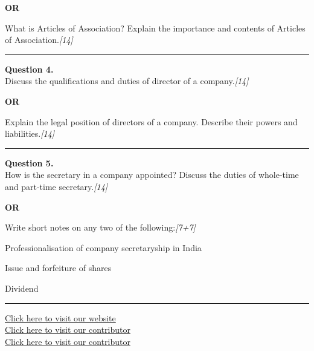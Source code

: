 \documentclass[11pt,a4paper]{article}
\newcommand{\pts}[1]{\hfill   \textit{[#1]}}
\begin{document}
\centerline{   \textbf{OR}}

What is Articles of Association? Explain the importance and contents of Articles of Association.\pts{14}

\medskip\rule{\linewidth}{0.2pt}




\noindent   \textbf{Question 4.} \\
Discuss the qualifications and duties of director of a company.\pts{14}

\centerline{   \textbf{OR}}

Explain the legal position of directors of a company. Describe their powers and liabilities.\pts{14}

\medskip\rule{\linewidth}{0.2pt}




\noindent   \textbf{Question 5.} \\
How is the secretary in a company appointed? Discuss the duties of whole-time and part-time secretary.\pts{14}

\centerline{   \textbf{OR}}

Write short notes on any two of the following:\pts{7+7}

\begin{parts}
  \item Professionalisation of company secretaryship in India
  \item Issue and forfeiture of shares
  \item Dividend
\end{parts}

\vfill
\rule{\linewidth}{0.4pt}

\begin{center}\small
\href{https://bhu-exam.vercel.app/}{Click here to visit our website}\\[4pt]
\href{https://me-aryan.vercel.app/}{Click here to visit our contributor}\\[4pt]
\href{https://quashan-me.vercel.app/}{Click here to visit our contributor}
\end{center}
\end{document}
